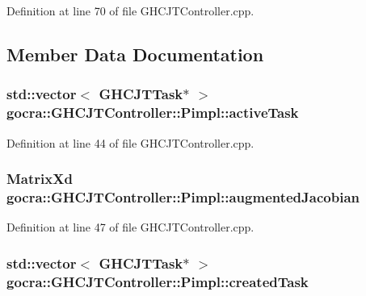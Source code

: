 Definition at line 70 of file G\+H\+C\+J\+T\+Controller.\+cpp.



\subsection{Member Data Documentation}
\subsubsection[{\texorpdfstring{active\+Task}{activeTask}}]{\setlength{\rightskip}{0pt plus 5cm}std\+::vector$<$ {\bf G\+H\+C\+J\+T\+Task}$\ast$ $>$ gocra\+::\+G\+H\+C\+J\+T\+Controller\+::\+Pimpl\+::active\+Task}\hypertarget{structgocra_1_1GHCJTController_1_1Pimpl_a2322f7612c4ee994869b897d6546da97}{}\label{structgocra_1_1GHCJTController_1_1Pimpl_a2322f7612c4ee994869b897d6546da97}


Definition at line 44 of file G\+H\+C\+J\+T\+Controller.\+cpp.

\subsubsection[{\texorpdfstring{augmented\+Jacobian}{augmentedJacobian}}]{\setlength{\rightskip}{0pt plus 5cm}Matrix\+Xd gocra\+::\+G\+H\+C\+J\+T\+Controller\+::\+Pimpl\+::augmented\+Jacobian}\hypertarget{structgocra_1_1GHCJTController_1_1Pimpl_a9ebc2b951dfa979568dfe12a36124424}{}\label{structgocra_1_1GHCJTController_1_1Pimpl_a9ebc2b951dfa979568dfe12a36124424}


Definition at line 47 of file G\+H\+C\+J\+T\+Controller.\+cpp.

\subsubsection[{\texorpdfstring{created\+Task}{createdTask}}]{\setlength{\rightskip}{0pt plus 5cm}std\+::vector$<$ {\bf G\+H\+C\+J\+T\+Task}$\ast$ $>$ gocra\+::\+G\+H\+C\+J\+T\+Controller\+::\+Pimpl\+::created\+Task}\hypertarget{structgocra_1_1GHCJTController_1_1Pimpl_ae336064c9007227c37ec24f455b4cc39}{}\label{structgocra_1_1GHCJTController_1_1Pimpl_ae336064c9007227c37ec24f455b4cc39}


